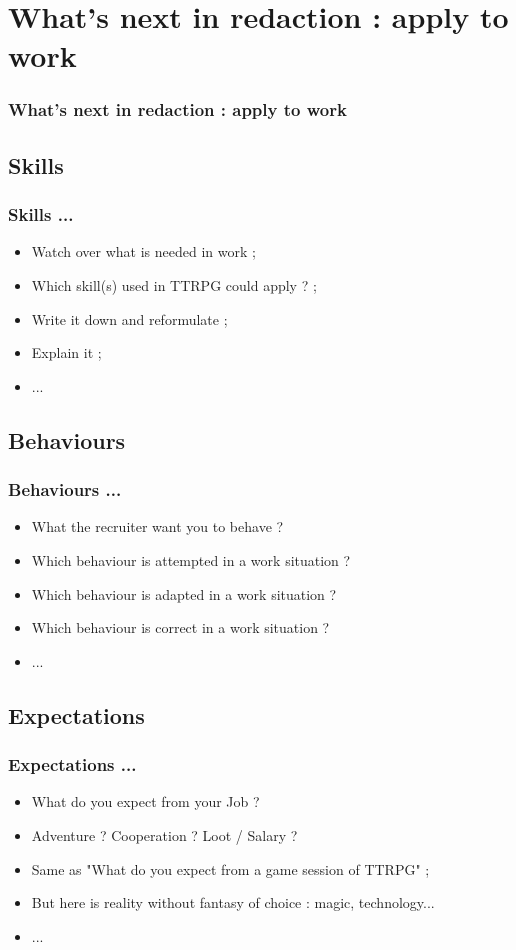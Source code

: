 \documentclass[slidetop,11pt]{beamer}
\begin{document}
\def\sectionIIItitle{What's next in redaction : apply to work}
\section{ \sectionIIItitle }
\begin{frame}
	\frametitle{ \sectionIIItitle }
	\tableofcontents[sections=3,currentsection,subsectionstyle=show/shaded/hide]
\end{frame} 

\subsection{ Skills }
\begin{frame}
	\frametitle{ Skills ... }
	\begin{itemize}
		\item Watch over what is needed in work ; 
		\item Which skill(s) used in TTRPG could apply ? ; 
		\item Write it down and reformulate ; 
		\item Explain it ; 
		\item ... 
	\end{itemize}
\end{frame}

\subsection{ Behaviours }
\begin{frame}
	\frametitle{ Behaviours ... }
	\begin{itemize}
		\item What the recruiter want you to behave ?
		\item Which behaviour is attempted in a work situation ?
		\item Which behaviour is adapted in a work situation ?
		\item Which behaviour is correct in a work situation ?
		\item ... 
	\end{itemize}
\end{frame}

\subsection{ Expectations }
\begin{frame}
	\frametitle{ Expectations ... }
	\begin{itemize}
		\item What do you expect from your Job ?
		\item Adventure ? Cooperation ? Loot / Salary ?
		\item Same as "What do you expect from a game session of TTRPG" ; 
		\item But here is reality without fantasy of choice : magic, technology...
		\item ... 
	\end{itemize}
\end{frame}
\end{document}
